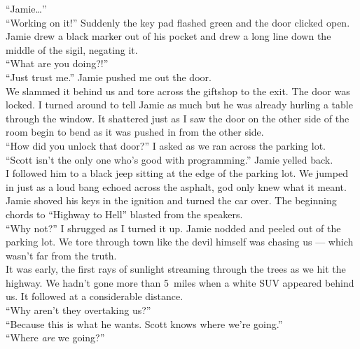 \documentclass[a5paper]{scrartcl}
\begin{document}
\enquote{Jamie\dots }\\


\enquote{Working on it!} Suddenly the key pad flashed green and the door clicked open. Jamie drew a black marker out of his pocket and drew a long line down the middle of the sigil, negating it. \\


\enquote{What are you doing?!}\\


\enquote{Just trust me.} Jamie pushed me out the door.\\


We slammed it behind us and tore across the giftshop to the exit. The door was locked. I turned around to tell Jamie as much but he was already hurling a table through the window. It shattered just as I saw the door on the other side of the room begin to bend as it was pushed in from the other side.\\


\enquote{How did you unlock that door?} I asked as we ran across the parking lot.\\


\enquote{Scott isn't the only one who's good with programming.} Jamie yelled back. \\


I followed him to a black jeep sitting at the edge of the parking lot. We jumped in just as a loud bang echoed across the asphalt, god only knew what it meant. Jamie shoved his keys in the ignition and turned the car over. The beginning chords to \enquote{Highway to Hell} blasted from the speakers.\\


\enquote{Why not?} I shrugged as I turned it up. Jamie nodded and peeled out of the parking lot. We tore through town like the devil himself was chasing us --- which wasn't far from the truth.\\


It was early, the first rays of sunlight streaming through the trees as we hit the highway. We hadn't gone more than 5~miles when a white SUV appeared behind us. It followed at a considerable distance.\\


\enquote{Why aren't they overtaking us?}\\


\enquote{Because this is what he wants. Scott knows where we're going.}\\


\enquote{Where \textit{are} we going?}\\
\end{document}
